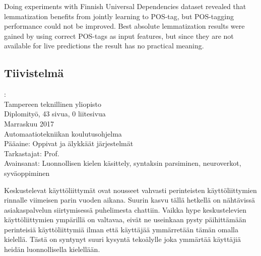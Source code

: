 \documentclass[12pt,a4paper,english
]{tutthesis}
\begin{document}
Doing experiments with Finnish Universal Dependencies dataset revealed that lemmatization benefits from jointly learning to POS-tag, but POS-tagging performance could not be improved. Best absolute lemmatization results were gained by using correct POS-tags as input features, but since they are not available for live predictions the result has no practical meaning.

 



\begin{otherlanguage}{finnish} %
\chapter*{Tiivistelmä} %

\begin{spacing}{1.0}
         {\bf \textsf{\MakeUppercase{\@author}}}: \@titleB\\  %
         \textsf{Tampereen teknillinen yliopisto}\\
         \textsf{Diplomityö, 43 sivua, 0 liitesivua}\\ %
         \textsf{Marraskuu 2017}\\
         \textsf{Automaatiotekniikan koulutusohjelma}\\
         \textsf{Pääaine: Oppivat ja älykkäät järjestelmät}\\
         \textsf{Tarkastajat: Prof. \@examiner}\\ %
         \textsf{Avainsanat: Luonnollisen kielen käsittely, syntaksin parsiminen, neuroverkot, syväoppiminen}\\
\end{spacing}

Keskustelevat käyttöliittymät ovat nousseet vahvasti perinteisten käyttöliittymien rinnalle viimeisen parin vuoden aikana. Suurin kasvu tällä hetkellä on nähtävissä asiakaspalvelun siirtymisessä puhelimesta chattiin. Vaikka hype keskustelevien käyttöliittymien ympärillä on valtavaa, eivät ne useinkaan pysty päihittämään perinteisiä käyttöliittymiä ilman että käyttäjää ymmärretään tämän omalla kielellä. Tästä on syntynyt suuri kysyntä tekoälylle joka ymmärtää käyttäjiä heidän luonnollisella kielellään.


\end{otherlanguage}
\end{document}
